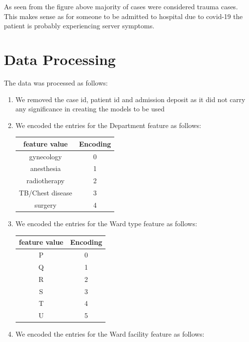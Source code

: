\documentclass[fleqn]{article}
\begin{document}
			As seen from the figure above majority of cases were considered trauma cases. This makes sense as for someone to be admitted to hospital due to covid-19 the patient is probably experiencing server symptoms.
			
		\newpage
	\section*{Data Processing}
	The data was processed as follows:
	\begin{enumerate}
        \item We removed the case id, patient id and admission deposit as it did not carry any significance in creating the models to be used
        \item We encoded the entries for the Department feature as follows:
            \begin{center}
            \begin{tabular}{ |c|c| } 
             \hline
             feature value & Encoding\\
             \hline
             gynecology & 0 \\ 
             anesthesia & 1\\ 
             radiotherapy & 2\\
             TB/Chest disease & 3\\
             surgery & 4\\
             \hline
            \end{tabular}
            \end{center}
        \item We encoded the entries for the Ward type feature as follows:
            \begin{center}
            \begin{tabular}{ |c|c| } 
             \hline
             feature value & Encoding\\
             \hline
             P & 0 \\ 
             Q & 1\\ 
             R & 2\\
             S & 3\\
             T & 4\\
             U & 5\\
             \hline
            \end{tabular}
            \end{center}
        \item We encoded the entries for the Ward facility feature as follows:

\end{enumerate}
\end{document}
